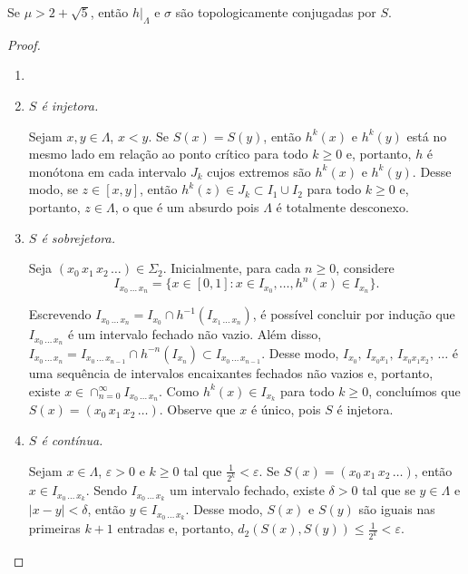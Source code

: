 \begin{theorem}\label{teo 6-1}
Se $\mu > 2 + \sqrt{5}$, então $h|_\Lambda$ e $\sigma$ são topologicamente conjugadas por $S$.
\end{theorem}

\begin{proof}
\begin{enumerate}[label=\alph*)]\item[]
\item \textit{$S$ é injetora.}

Sejam $x, y \in \Lambda$, $x < y$. Se $S(x) = S(y)$, então $h^k(x)$ e $h^k(y)$ está no mesmo lado em relação ao ponto crítico para todo $k \geq 0$ e, portanto, $h$ é monótona em cada intervalo $J_k$ cujos extremos são $h^k(x)$ e $h^k(y)$. Desse modo, se $z \in [x, y]$, então $h^k(z) \in J_k \subset I_1 \cup I_2$ para todo $k \geq 0$ e, portanto, $z \in \Lambda$, o que é um absurdo pois $\Lambda$ é totalmente desconexo.

\item \textit{$S$ é sobrejetora.}

Seja $(x_0 \, x_1 \, x_2 \, \dots) \in \Sigma_2$. Inicialmente, para cada $n \geq 0$, considere
$$I_{x_0 \, \dots \, x_n} = \lbrace x \in [0,1] : x \in I_{x_0}, \dots, h^n(x) \in I_{x_n} \rbrace.$$

Escrevendo $I_{x_0 \, \dots \, x_n} = I_{x_0} \cap h^{-1}(I_{x_1 \, \dots \, x_n})$, é possível concluir por indução que $I_{x_0 \, \dots \, x_n}$ é um intervalo fechado não vazio.
Além disso, $I_{x_0 \, \dots \, x_n} = I_{x_0 \, \dots \, x_{n-1}} \cap h^{-n}(I_{x_n}) \subset I_{x_0 \, \dots \, x_{n-1}}$.
Desse modo, $I_{x_0}, \, I_{x_0 x_1}, \, I_{x_0 x_1 x_2}, \, \dots$ é uma sequência de intervalos encaixantes fechados não vazios e, portanto, existe $x \in \cap_{n=0}^\infty I_{x_0 \, \dots \, x_n}$. Como $h^k(x) \in I_{x_k}$ para todo $k \geq 0$, concluímos que $S(x) = (x_0 \, x_1 \, x_2 \, \dots)$. Observe que $x$ é único, pois $S$ é injetora.

\item \textit{$S$ é contínua.}

Sejam $x \in \Lambda$, $\varepsilon > 0$ e $k \geq 0$ tal que $\frac{1}{2^k} < \varepsilon$. Se $S(x) = (x_0 \, x_1 \, x_2 \, \dots)$, então $x \in I_{x_0 \, \dots \, x_k}$. Sendo $I_{x_0 \, \dots \, x_k}$ um intervalo fechado, existe $\delta > 0$ tal que se $y \in \Lambda$ e $|x-y| < \delta$, então $y \in I_{x_0 \, \dots \, x_k}$. Desse modo, $S(x)$ e $S(y)$ são iguais nas primeiras $k+1$ entradas e, portanto, $d_2(S(x), S(y)) \leq \frac{1}{2^k} < \varepsilon$.


\end{enumerate}
\end{proof}
